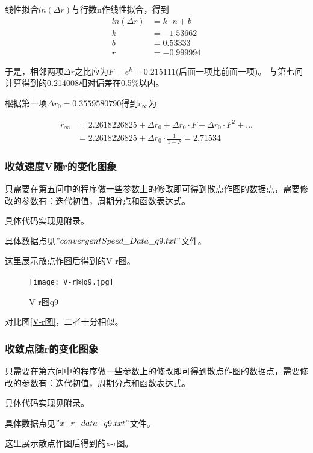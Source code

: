 \documentclass[10pt, a4paper]{article}
\begin{document}
    线性拟合$ln(\Delta r)$与行数n作线性拟合，得到
    \begin{align}
        ln(\Delta r)&=k\cdot n+b\\
        k&=-1.53662\\
        b&=0.53333\\
        r&=-0.999994
    \end{align}

    于是，相邻两项$\Delta r$之比应为$F=e^k=0.215111$(后面一项比前面一项)。
    与第七问计算得到的0.214008相对偏差在0.5$\%$以内。

    根据第一项$\Delta r_0=0.3559580790$得到$r_\infty$为

    \begin{align}
        r_\infty&=2.2618226825+\Delta r_0+\Delta r_0\cdot F+\Delta r_0\cdot F^2+\dots\\
        &=2.2618226825+\Delta r_0\cdot \frac{1}{1-F}=2.71534
    \end{align}

    \subsubsection{收敛速度V随r的变化图象}

    只需要在第五问中的程序做一些参数上的修改即可得到散点作图的数据点，需要修改的参数有：迭代初值，周期分点和函数表达式。

    具体代码实现见附录。

    具体数据点见$"convergentSpeed\_Data\_q9.txt"$文件。

    这里展示散点作图后得到的V-r图。

    \begin{figure}[H]
        \centering
        \texttt{[image: V-r图q9.jpg]}
        \caption{V-r图q9}
        \label{V-r图q9}
    \end{figure}

    对比图\ref{V-r图}，二者十分相似。

    \subsubsection{收敛点随r的变化图象}

    只需要在第六问中的程序做一些参数上的修改即可得到散点作图的数据点，需要修改的参数有：迭代初值，周期分点和函数表达式。

    具体代码实现见附录。

    具体数据点见$"x\_r\_data\_q9.txt"$文件。

    这里展示散点作图后得到的x-r图。
\end{document}
